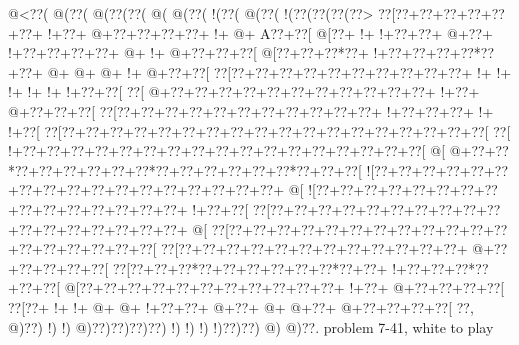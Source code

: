 \vbox{\vbox{\goo
\- @<\0??(\- @(\0??(\- @(\0??(\0??(\- @(\- @(\0??(\- !(\0??(\- @(\0??(\- !(\0??(\0??(\0??(\0??>
\0??[\0??+\0??+\0??+\0??+\0??+\0??+\- !+\0??+\- @+\0??+\0??+\0??+\0??+\- !+\- @+\!  A\0??+\0??[
\- @[\0??+\- !+\- !+\0??+\0??+\- @+\0??+\- !+\0??+\0??+\0??+\0??+\- @+\- !+\- @+\0??+\0??+\0??[
\- @[\0??+\0??+\0??*\0??+\- !+\0??+\0??+\0??+\0??*\0??+\0??+\- @+\- @+\- @+\- !+\- @+\0??+\0??[
\0??[\0??+\0??+\0??+\0??+\0??+\0??+\0??+\0??+\0??+\0??+\- !+\- !+\- !+\- !+\- !+\- !+\0??+\0??[
\0??[\- @+\0??+\0??+\0??+\0??+\0??+\0??+\0??+\0??+\0??+\0??+\0??+\- !+\0??+\- @+\0??+\0??+\0??[
\0??[\0??+\0??+\0??+\0??+\0??+\0??+\0??+\0??+\0??+\0??+\0??+\- !+\0??+\0??+\0??+\- !+\- !+\0??[
\0??[\0??+\0??+\0??+\0??+\0??+\0??+\0??+\0??+\0??+\0??+\0??+\0??+\0??+\0??+\0??+\0??+\0??+\0??[
\0??[\- !+\0??+\0??+\0??+\0??+\0??+\0??+\0??+\0??+\0??+\0??+\0??+\0??+\0??+\0??+\0??+\0??+\0??[
\- @[\- @+\0??+\0??*\0??+\0??+\0??+\0??+\0??+\0??*\0??+\0??+\0??+\0??+\0??+\0??*\0??+\0??+\0??[
\- ![\0??+\0??+\0??+\0??+\0??+\0??+\0??+\0??+\0??+\0??+\0??+\0??+\0??+\0??+\0??+\0??+\0??+\- @[
\- ![\0??+\0??+\0??+\0??+\0??+\0??+\0??+\0??+\0??+\0??+\0??+\0??+\0??+\0??+\0??+\- !+\0??+\0??[
\0??[\0??+\0??+\0??+\0??+\0??+\0??+\0??+\0??+\0??+\0??+\0??+\0??+\0??+\0??+\0??+\0??+\0??+\- @[
\0??[\0??+\0??+\0??+\0??+\0??+\0??+\0??+\0??+\0??+\0??+\0??+\0??+\0??+\0??+\0??+\0??+\0??+\0??[
\0??[\0??+\0??+\0??+\0??+\0??+\0??+\0??+\0??+\0??+\0??+\0??+\0??+\- @+\0??+\0??+\0??+\0??+\0??[
\0??[\0??+\0??+\0??*\0??+\0??+\0??+\0??+\0??+\0??*\0??+\0??+\- !+\0??+\0??+\0??*\0??+\0??+\0??[
\- @[\0??+\0??+\0??+\0??+\0??+\0??+\0??+\0??+\0??+\0??+\0??+\- !+\0??+\- @+\0??+\0??+\0??+\0??[
\0??[\0??+\- !+\- !+\- @+\- @+\- !+\0??+\0??+\- @+\0??+\- @+\- @+\0??+\- @+\0??+\0??+\0??+\0??[
\0??,\- @)\0??)\- !)\- !)\- @)\0??)\0??)\0??)\0??)\- !)\- !)\- !)\- !)\0??)\0??)\- @)\- @)\0??.
}
\hfil problem 7-41, white to play\hfil\break
}


